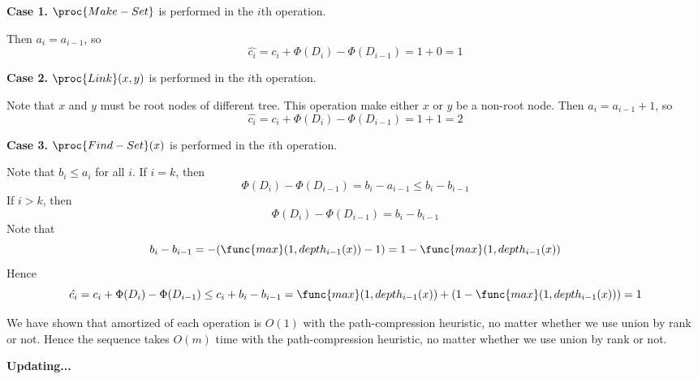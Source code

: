 \textbf{Case 1.}
$\proc{Make-Set}$ is performed in the $i$th operation.

Then $a_i = a_{i-1}$, so
\begin{equation*}
    \hat{c_i} = c_i + \Phi(D_i) - \Phi(D_{i-1})
    = 1 + 0 = 1
\end{equation*}

\textbf{Case 2.}
$\proc{Link}(x,y)$ is performed in the $i$th operation.

Note that $x$ and $y$ must be root nodes of different tree.
This operation make either $x$ or $y$ be a non-root node.
Then $a_i = a_{i-1} + 1$, so
\begin{equation*}
    \hat{c_i} = c_i + \Phi(D_i) - \Phi(D_{i-1})
    = 1 + 1 = 2
\end{equation*}

\textbf{Case 3.}
$\proc{Find-Set}(x)$ is performed in the $i$th operation.

Note that $b_i \leq a_i$ for all $i$.
If $i = k$, then 
\begin{equation*}
    \Phi(D_i) - \Phi(D_{i-1})
    = b_{i} - a_{i - 1}
    \leq b_{i} - b_{i - 1}
\end{equation*}
If $i > k$, then
\begin{equation*}
    \Phi(D_i) - \Phi(D_{i-1})
    = b_{i} - b_{i - 1}
\end{equation*}
Note that 
\begin{equation*}
    b_{i} - b_{i - 1} = - (\func{max}(1,depth_{i-1}(x)) - 1) = 1 - \func{max}(1,depth_{i-1}(x))
\end{equation*}
Hence 
\begin{equation*}
    \hat{c_i} = c_i + \Phi(D_i) - \Phi(D_{i-1})
    \leq c_i + b_{i} - b_{i - 1}
    = \func{max}(1,depth_{i-1}(x)) + (1 - \func{max}(1,depth_{i-1}(x)))
    = 1
\end{equation*}

We have shown that amortized of each operation is $O(1)$ 
with the path-compression heuristic,
no matter whether we use union by rank or not.
Hence the sequence takes $O(m)$ time 
with the path-compression heuristic,
no matter whether we use union by rank or not.




\centerline{\textbf{Updating...}}

